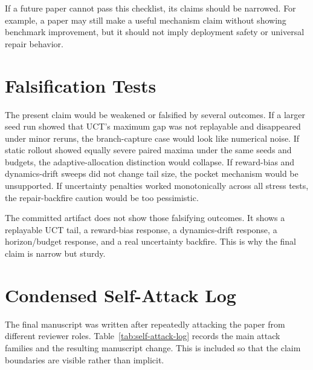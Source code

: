 \documentclass{article}
\begin{document}
If a future paper cannot pass this checklist, its claims should be narrowed. For example, a paper may still make a useful mechanism claim without showing benchmark improvement, but it should not imply deployment safety or universal repair behavior.

\section{Falsification Tests}

The present claim would be weakened or falsified by several outcomes. If a larger seed run showed that UCT's maximum gap was not replayable and disappeared under minor reruns, the branch-capture case would look like numerical noise. If static rollout showed equally severe paired maxima under the same seeds and budgets, the adaptive-allocation distinction would collapse. If reward-bias and dynamics-drift sweeps did not change tail size, the pocket mechanism would be unsupported. If uncertainty penalties worked monotonically across all stress tests, the repair-backfire caution would be too pessimistic.

The committed artifact does not show those falsifying outcomes. It shows a replayable UCT tail, a reward-bias response, a dynamics-drift response, a horizon/budget response, and a real uncertainty backfire. This is why the final claim is narrow but sturdy.

\section{Condensed Self-Attack Log}

The final manuscript was written after repeatedly attacking the paper from different reviewer roles. Table~\ref{tab:self-attack-log} records the main attack families and the resulting manuscript change. This is included so that the claim boundaries are visible rather than implicit.
\end{document}
